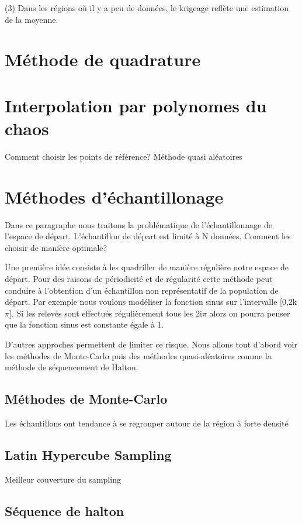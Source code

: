 \documentclass[hidelinks,12pt]{article}
\begin{document}
(3) Dans les régions où il y a peu de données, le krigeage reflète une estimation de la moyenne.

\section{Méthode de quadrature}
\section{Interpolation par polynomes du chaos}


Comment choisir les points de référence? Méthode quasi aléatoires
\section{Méthodes d’échantillonage}

Dans ce paragraphe nous traitons la problématique de l’échantillonnage de l’espace de départ. L’échantillon de départ est limité à N données. Comment les choisir de manière optimale? 

Une première idée consiste à les quadriller de manière régulière notre espace de départ. Pour des raisons de périodicité et de régularité cette méthode peut conduire à l’obtention d’un échantillon non représentatif de la population de départ. Par exemple nous voulons modéliser la fonction sinus sur l’intervalle [0,2k$\pi$]. Si les relevés sont effectués régulièrement tous les 2i$\pi$ alors on pourra penser que la fonction sinus est constante égale à 1. 

D’autres approches permettent de limiter ce risque. Nous allons tout d’abord voir les méthodes de Monte-Carlo puis des méthodes quasi-aléatoires comme la méthode de séquencement de Halton.

\subsection{Méthodes de Monte-Carlo}

Les échantillons ont tendance à se regrouper autour de la région à forte densité


\subsection{Latin Hypercube Sampling}

Meilleur couverture du sampling

\subsection{Séquence de halton}
\end{document}
